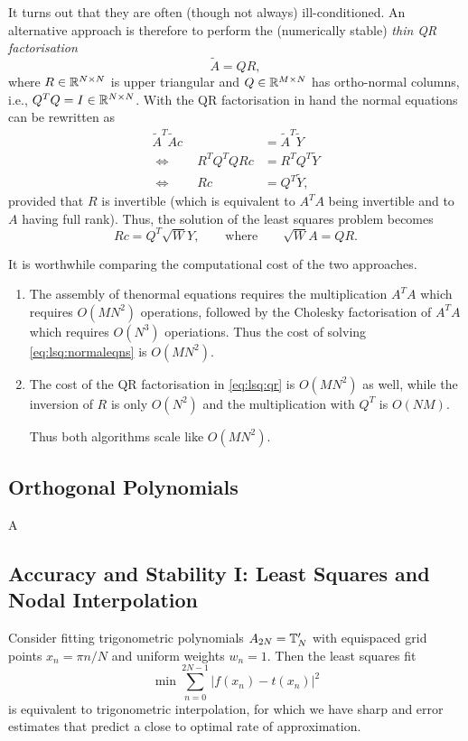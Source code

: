 It turns out that they are often (though not always) ill-conditioned. 
An alternative approach is therefore to perform the (numerically stable)
{\em thin QR factorisation}
\[
    \tilde{A} = Q R,   
\]
where $R \in \mathbb{R}^{N \times N}$ is upper triangular and  $Q \in \mathbb{R}^{M \times N}$
has ortho-normal columns, i.e., $Q^T Q = I \in \mathbb{R}^{N \times N}$. 
With the QR factorisation in hand the normal equations can be rewritten as 
\begin{align*}
    \tilde{A}^T\tilde{A} c &= \tilde{A}^T \tilde{Y} \\ 
    \Leftrightarrow \qquad 
    R^T Q^T Q R c &= R^T Q^T \tilde{Y} \\ 
    \Leftrightarrow \qquad 
    R c &= Q^T \tilde{Y},
\end{align*}
provided that $R$ is invertible (which is equivalent to $A^T A$ being invertible 
and to $A$ having full rank). Thus, the solution of the least squares problem 
becomes 
\begin{equation}
    \label{eq:lsq:qr}
    R c = Q^T \sqrt{W} Y, \qquad \text{where} \qquad 
    \sqrt{W} A = QR.
\end{equation}

It is worthwhile comparing the computational cost of the two approaches. 
\begin{enumerate}
\item The assembly of thenormal equations requires the multiplication 
$A^T A$ which requires $O(M N^2)$ operations, followed by  the 
Cholesky factorisation of $A^T A$ which requires $O(N^3)$ operiations. 
Thus the cost of solving \eqref{eq:lsq:normaleqns} is $O(M N^2)$. 
\item The cost of the QR factorisation in \eqref{eq:lsq:qr} is 
$O(M N^2)$ as well, while the inversion of $R$ is only $O(N^2)$ and the 
multiplication with $Q^T$ is $O(NM)$. 

Thus both algorithms scale like $O(M N^2)$.
\end{enumerate}


\subsection{Orthogonal Polynomials}
%
\label{sec:lsq:orthpolys}
%
A


\subsection{Accuracy and Stability I: Least Squares and Nodal Interpolation}
%
Consider fitting trigonometric polynomials $A_{2N} = \mathbb{T}_N'$ with equispaced
grid points $x_n = \pi n / N$ and uniform weights $w_n = 1$. Then the
least squares fit 
\[
    \min \sum_{n = 0}^{2N-1} |f(x_n) - t(x_n)|^2 
\]
is equivalent to trigonometric interpolation, for which we have sharp and error
estimates that predict a close to optimal rate of approximation. 

